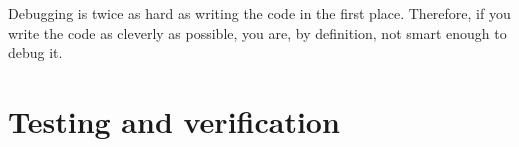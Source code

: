 

\begin{savequote}[0.55\linewidth]
	\begin{fancyquote}
	\footnotesize\upshape
	Debugging is twice as hard as writing the code in the first place.
	Therefore, if you write the code as cleverly as possible, you are, by
	definition, not smart enough to debug it.
	\end{fancyquote}
\end{savequote}
\chapter{Testing and verification}\label{ch:testing}
